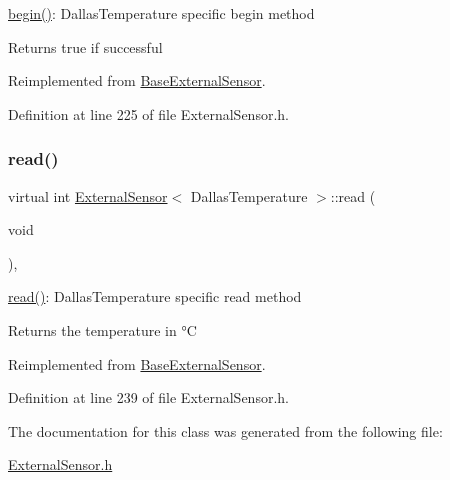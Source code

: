 \hyperlink{class_external_sensor_3_01_dallas_temperature_01_4_ac5275129b05e2ff8df45d5b222a661d9}{begin()}\+: Dallas\+Temperature specific begin method

\begin{DoxyReturn}{Returns}
true if successful 
\end{DoxyReturn}


Reimplemented from \hyperlink{class_base_external_sensor_a87d132803d4f4fdd4e66332809f0c9a0}{Base\+External\+Sensor}.



Definition at line 225 of file External\+Sensor.\+h.

\mbox{\label{class_external_sensor_3_01_dallas_temperature_01_4_a127ead06440ec972c22db2abeb8e2b51}} 
\subsubsection{\texorpdfstring{read()}{read()}}
{\footnotesize\ttfamily virtual int \hyperlink{class_external_sensor}{External\+Sensor}$<$ Dallas\+Temperature $>$\+::read (\begin{DoxyParamCaption}\item[{void}]{ }\end{DoxyParamCaption})\hspace{0.3cm}{\ttfamily [inline]}, {\ttfamily [virtual]}}

\hyperlink{class_external_sensor_3_01_dallas_temperature_01_4_a127ead06440ec972c22db2abeb8e2b51}{read()}\+: Dallas\+Temperature specific read method

\begin{DoxyReturn}{Returns}
the temperature in °C 
\end{DoxyReturn}


Reimplemented from \hyperlink{class_base_external_sensor_a7e0a98f350148d7645031315657aa5ec}{Base\+External\+Sensor}.



Definition at line 239 of file External\+Sensor.\+h.



The documentation for this class was generated from the following file\+:\begin{DoxyCompactItemize}
\item 
\hyperlink{_external_sensor_8h}{External\+Sensor.\+h}\end{DoxyCompactItemize}
